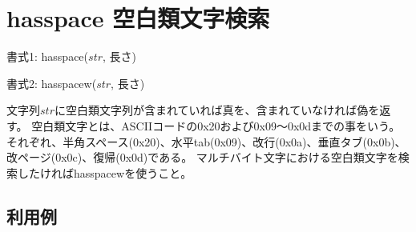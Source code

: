 
%

\section{hasspace 空白類文字検索\label{sect:hasspace}}

書式1: hasspace($str$, 長さ)

書式2: hasspacew($str$, 長さ)

文字列$str$に空白類文字列が含まれていれば真を、含まれていなければ偽を返す。
空白類文字とは、ASCIIコードの0x20および0x09〜0x0dまでの事をいう。
それぞれ、半角スペース(0x20)、水平tab(0x09)、改行(0x0a)、垂直タブ(0x0b)、改ページ(0x0c)、復帰(0x0d)である。
マルチバイト文字における空白類文字を検索したければhasspacewを使うこと。

\subsection*{利用例}


%

